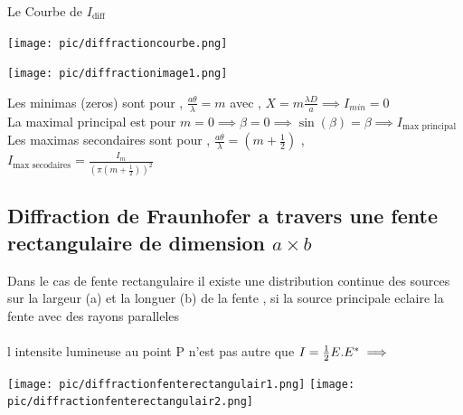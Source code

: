 \documentclass[12pt]{book}
\begin{document}
                Le Courbe de $I_{\text{diff}}$\\
                \begin{center}
                    \begin{minipage}{0.39\linewidth}
                        \texttt{[image: pic/diffractioncourbe.png]}
                    \end{minipage}
                    \begin{minipage}{0.59\linewidth}
                        \texttt{[image: pic/diffractionimage1.png]}
                    \end{minipage}
                \end{center}
                Les minimas (zeros) sont pour  , $\frac{a\theta}{\lambda}=m $ avec  , $X=m\frac{\lambda D}{a} \implies I_{min} = 0$ \\
                La maximal principal est pour  $m = 0 \implies \beta =0 \implies \sin(\beta ) = \beta \implies I_{\text{max principal}}$\\
                Les maximas secondaires sont pour  , $\frac{a\theta}{\lambda} = (m+\frac{1}{2})$  ,\\  $I_{\text{max secodaires}} = \frac{I_m}{(\pi(m+\frac{1}{2}))^2}$
            \subsection{Diffraction de Fraunhofer a travers une fente rectangulaire de dimension $a \times b$}    
                Dans le cas de fente rectangulaire il existe une distribution continue des sources sur la largeur (a) et la longuer (b) de la fente , si la source principale eclaire la fente avec des rayons paralleles \\
                \\
                l intensite lumineuse au point P n'est pas autre que $ I =\frac{1}{2}E.E^{*} \\ 
                \implies $  \\
                \begin{center}
                    \texttt{[image: pic/diffractionfenterectangulair1.png]}
                    \texttt{[image: pic/diffractionfenterectangulair2.png]}
                \end{center}
        
\end{document}
